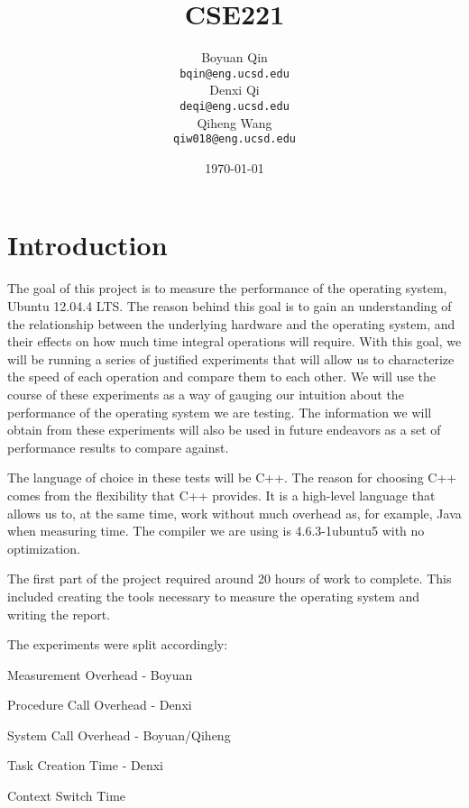 \documentclass{article} %
\title{CSE221}
\author{
  Boyuan Qin\\
  \texttt{bqin@eng.ucsd.edu}\\
  \And
  Denxi Qi\\
  \texttt{deqi@eng.ucsd.edu}\\
  \And
  Qiheng Wang\\
  \texttt{qiw018@eng.ucsd.edu}\\
}
\date{\today}
\begin{document}
\maketitle

\section{Introduction}
The goal of this project is to measure the performance of the operating system, Ubuntu 12.04.4 LTS. The reason behind this goal is to gain an understanding of the relationship between the underlying hardware and the operating system, and their effects on how much time integral operations will require. With this goal, we will be running a series of justified experiments that will allow us to characterize the speed of each operation and compare them to each other. We will use the course of these experiments as a way of gauging our intuition about the performance of the operating system we are testing. The information we will obtain from these experiments will also be used in future endeavors as a set of performance results to compare against. 

The language of choice in these tests will be C++. The reason for choosing C++ comes from the flexibility that C++ provides. It is a high-level language that allows us to, at the same time, work without much overhead as, for example, Java when measuring time. The compiler we are using is 4.6.3-1ubuntu5 with no optimization.

The first part of the project required around 20 hours of work to complete. This included creating the tools necessary to measure the operating system and writing the report. 

The experiments were split accordingly:

Measurement Overhead - Boyuan

Procedure Call Overhead - Denxi

System Call Overhead - Boyuan/Qiheng

Task Creation Time - Denxi

Context Switch Time
\end{document}
